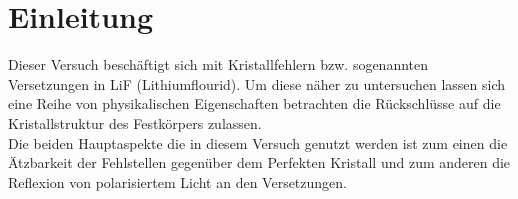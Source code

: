 \section{Einleitung}
Dieser Versuch beschäftigt sich mit Kristallfehlern bzw. sogenannten Versetzungen in LiF (Lithiumflourid). Um diese
näher zu untersuchen lassen sich eine Reihe von physikalischen Eigenschaften betrachten die Rückschlüsse auf die Kristallstruktur des
Festkörpers zulassen.\\
Die beiden Hauptaspekte die in diesem Versuch genutzt werden ist zum einen die Ätzbarkeit der Fehlstellen gegenüber dem Perfekten Kristall und zum anderen
die Reflexion von polarisiertem Licht an den Versetzungen.